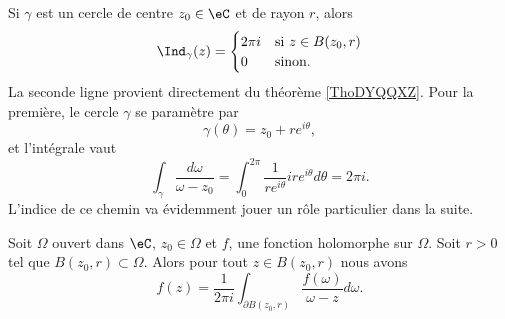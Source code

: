 \begin{example} \label{ExradygL}
    Si \( \gamma\) est un cercle de centre \( z_0\in \eC\) et de rayon \( r\), alors 
    \begin{equation}
        \Ind_{\gamma}(z)=\begin{cases}
            2\pi i    &   \text{si \( z\in B(z_0,r)\)}\\
            0    &    \text{sinon}.
        \end{cases}
    \end{equation}
    La seconde ligne provient directement du théorème \ref{ThoDYQQXZ}. Pour la première, le cercle \( \gamma\) se paramètre par
    \begin{equation}
        \gamma(\theta)=z_0+r e^{i\theta},
    \end{equation}
    et l'intégrale vaut
    \begin{equation}
        \int_{\gamma}\frac{ d\omega }{ \omega-z_0 }=\int_0^{2\pi}\frac{1}{ r e^{i\theta} }ir e^{i\theta}d\theta=2\pi i.
    \end{equation}
    L'indice de ce chemin va évidemment jouer un rôle particulier dans la suite.
\end{example}

\begin{theorem}   \label{ThoUHztQe}
    Soit \( \Omega\) ouvert dans \( \eC\), \( z_0\in \Omega\) et \( f\), une fonction holomorphe sur \( \Omega\). Soit \( r>0\) tel que \( B(z_0,r)\subset \Omega\). Alors pour tout \( z\in B(z_0,r)\) nous avons
    \begin{equation}    \label{EqPzUABM}
        f(z)=\frac{1}{ 2\pi i }\int_{\partial B(z_0,r)}\frac{ f(\omega) }{ \omega-z }d\omega.
    \end{equation}
\end{theorem}

